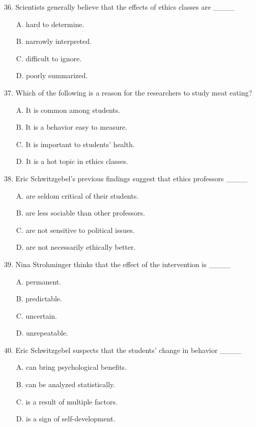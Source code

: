 \documentclass[UTF8,11pt]{ctexart}
\begin{document}
36. Scientists generally believe that the effects of ethics classes are \_\_\_\_


\begin{itemize}[leftmargin=2em,itemsep=.2em,topsep=.4em]\item[A.] hard to determine.
\item[B.] narrowly interpreted.
\item[C.] difficult to ignore.
\item[D.] poorly summarized.
\end{itemize}

37. Which of the following is a reason for the researchers to study meat eating?


\begin{itemize}[leftmargin=2em,itemsep=.2em,topsep=.4em]\item[A.] It is common among students.
\item[B.] It is a behavior easy to measure.
\item[C.] It is important to students’ health.
\item[D.] It is a hot topic in ethics classes.
\end{itemize}

38. Eric Schwitzgebel’s previous findings suggest that ethics professors \_\_\_\_


\begin{itemize}[leftmargin=2em,itemsep=.2em,topsep=.4em]\item[A.] are seldom critical of their students.
\item[B.] are less sociable than other professors.
\item[C.] are not sensitive to political issues.
\item[D.] are not necessarily ethically better.
\end{itemize}

39. Nina Strohminger thinks that the effect of the intervention is \_\_\_\_


\begin{itemize}[leftmargin=2em,itemsep=.2em,topsep=.4em]\item[A.] permanent.
\item[B.] predictable.
\item[C.] uncertain.
\item[D.] unrepeatable.
\end{itemize}

40. Eric Schwitzgebel suspects that the students’ change in behavior \_\_\_\_


\begin{itemize}[leftmargin=2em,itemsep=.2em,topsep=.4em]\item[A.] can bring psychological benefits.
\item[B.] can be analyzed statistically.
\item[C.] is a result of multiple factors.
\item[D.] is a sign of self-development.
\end{itemize}
\end{document}
